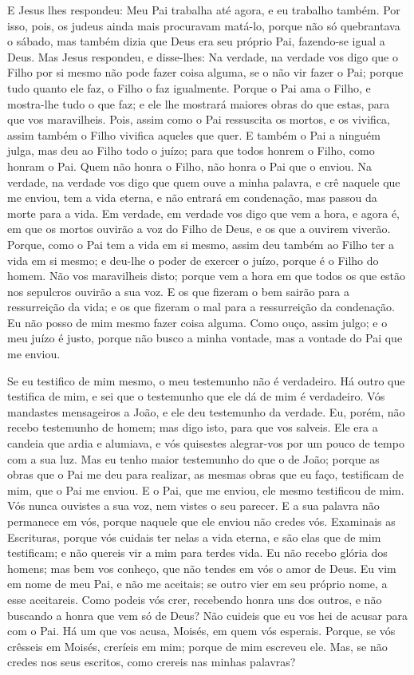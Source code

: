 E Jesus lhes respondeu: Meu Pai trabalha até agora, e eu trabalho
também. Por isso, pois, os judeus ainda mais procuravam
matá-lo, porque não só quebrantava o sábado, mas também dizia que
Deus era seu próprio Pai, fazendo-se igual a Deus. Mas Jesus
respondeu, e disse-lhes: Na verdade, na verdade vos digo que o Filho
por si mesmo não pode fazer coisa alguma, se o não vir fazer o Pai;
porque tudo quanto ele faz, o Filho o faz igualmente. Porque
o Pai ama o Filho, e mostra-lhe tudo o que faz; e ele lhe mostrará
maiores obras do que estas, para que vos maravilheis. Pois,
assim como o Pai ressuscita os mortos, e os vivifica, assim também o
Filho vivifica aqueles que quer. E também o Pai a ninguém
julga, mas deu ao Filho todo o juízo; para que todos honrem o
Filho, como honram o Pai. Quem não honra o Filho, não honra o Pai
que o enviou. Na verdade, na verdade vos digo que quem ouve a
minha palavra, e crê naquele que me enviou, tem a vida eterna, e não
entrará em condenação, mas passou da morte para a vida. Em
verdade, em verdade vos digo que vem a hora, e agora é, em que os
mortos ouvirão a voz do Filho de Deus, e os que a ouvirem viverão.
Porque, como o Pai tem a vida em si mesmo, assim deu também
ao Filho ter a vida em si mesmo; e deu-lhe o poder de exercer
o juízo, porque é o Filho do homem. Não vos maravilheis
disto; porque vem a hora em que todos os que estão nos sepulcros
ouvirão a sua voz. E os que fizeram o bem sairão para a
ressurreição da vida; e os que fizeram o mal para a ressurreição da
condenação. Eu não posso de mim mesmo fazer coisa alguma.
Como ouço, assim julgo; e o meu juízo é justo, porque não busco a
minha vontade, mas a vontade do Pai que me enviou.

Se eu testifico de mim mesmo, o meu testemunho não é verdadeiro.
Há outro que testifica de mim, e sei que o testemunho que ele
dá de mim é verdadeiro. Vós mandastes mensageiros a João, e
ele deu testemunho da verdade. Eu, porém, não recebo
testemunho de homem; mas digo isto, para que vos salveis. Ele
era a candeia que ardia e alumiava, e vós quisestes alegrar-vos por
um pouco de tempo com a sua luz. Mas eu tenho maior
testemunho do que o de João; porque as obras que o Pai me deu para
realizar, as mesmas obras que eu faço, testificam de mim, que o Pai
me enviou. E o Pai, que me enviou, ele mesmo testificou de
mim. Vós nunca ouvistes a sua voz, nem vistes o seu parecer.
E a sua palavra não permanece em vós, porque naquele que ele
enviou não credes vós. Examinais as Escrituras, porque vós
cuidais ter nelas a vida eterna, e são elas que de mim testificam;
e não quereis vir a mim para terdes vida. Eu não
recebo glória dos homens; mas bem vos conheço, que não tendes
em vós o amor de Deus. Eu vim em nome de meu Pai, e não me
aceitais; se outro vier em seu próprio nome, a esse aceitareis.
Como podeis vós crer, recebendo honra uns dos outros, e não
buscando a honra que vem só de Deus? Não cuideis que eu vos
hei de acusar para com o Pai. Há um que vos acusa, Moisés, em quem
vós esperais. Porque, se vós crêsseis em Moisés, creríeis em
mim; porque de mim escreveu ele. Mas, se não credes nos seus
escritos, como crereis nas minhas palavras?

